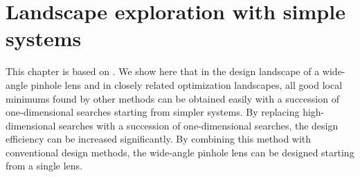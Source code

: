 \setlength{\parskip}{.2em}
\graphicspath{ {./chapter-3/figures/} }
\captionsetup[figure]{labelfont=bf}
\captionsetup{margin=1.5em}
\captionsetup[table]{labelfont=bf}


\chapter{Landscape exploration with simple systems}
\label{chapter_3}







\noindent This chapter is based on \cite{HouSimple16}. We show here that in the design landscape of a wide-angle pinhole lens and in closely related optimization landscapes, all good local minimums found by other methods can be obtained easily with a succession of one-dimensional searches starting from simpler systems. By replacing high-dimensional searches with a succession of one-dimensional searches, the design efficiency can be increased significantly. By combining this method with conventional design methods, the wide-angle pinhole lens can be designed starting from a single lens.

